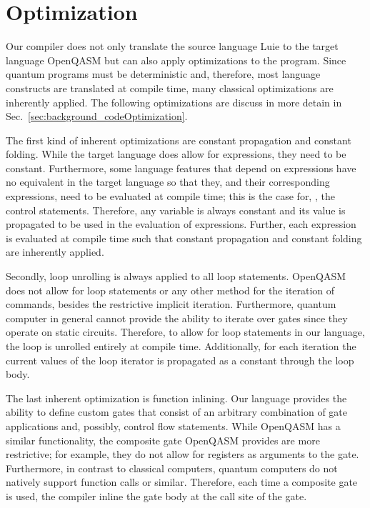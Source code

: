 \section{Optimization}
Our compiler does not only translate the source language Luie to the target language OpenQASM but can also apply optimizations to the program. Since quantum programs must be deterministic and, therefore, most language constructs are translated at compile time, many classical optimizations are inherently applied. The following optimizations are discuss in more detain in Sec.~\ref{sec:background_codeOptimization}.

The first kind of inherent optimizations are constant propagation and constant folding. 
While the target language does allow for expressions, they need to be constant. Furthermore, some language features that depend on expressions have no equivalent in the target language so that they, and their corresponding expressions, need to be evaluated at compile time; this is the case for, \eg, the control statements. Therefore, any variable is always constant and its value is propagated to be used in the evaluation of expressions. Further, each expression is evaluated at compile time such that constant propagation and constant folding are inherently applied.

Secondly, loop unrolling is always applied to all loop statements. OpenQASM does not allow for loop statements or any other method for the iteration of commands, besides the restrictive implicit iteration. Furthermore, quantum computer in general cannot provide the ability to iterate over gates since they operate on static circuits. Therefore, to allow for loop statements in our language, the loop is unrolled entirely at compile time. Additionally, for each iteration the current values of the loop iterator is propagated as a constant through the loop body.   

The last inherent optimization is function inlining. Our language provides the ability to define custom gates that consist of an arbitrary combination of gate applications and, possibly, control flow statements. While OpenQASM has a similar functionality, the composite gate OpenQASM provides are more restrictive; for example, they do not allow for registers as arguments to the gate. Furthermore, in contrast to classical computers, quantum computers do not natively support function calls or similar. Therefore, each time a composite gate is used, the compiler inline the gate body at the call site of the gate.   

